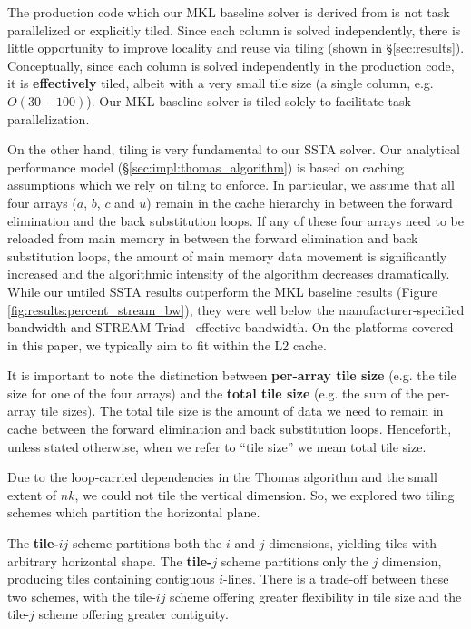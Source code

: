 \documentclass[10pt, conference, compsocconf]{IEEEtran}
\begin{document}
The production code which our MKL baseline solver is derived from is not task
  parallelized or explicitly tiled.
Since each column is solved independently, there is little opportunity to improve
  locality and reuse via tiling (shown in \S\ref{sec:results}).
Conceptually, since each column is solved independently in the production code,
  it is \textbf{effectively} tiled, albeit with a very small tile size (a single
  column, e.g. \(O(30-100)\)).
Our MKL baseline solver is tiled solely to facilitate task parallelization.

On the other hand, tiling is very fundamental to our SSTA solver.
Our analytical performance model (\S\ref{sec:impl:thomas_algorithm})
  is based on caching assumptions which we rely on tiling to enforce.
In particular, we assume that all four arrays (\(a\), \(b\), \(c\) and \(u\))
  remain in the cache hierarchy in between the forward elimination and the
  back substitution loops.
If any of these four arrays need to be reloaded from main memory in between the
  forward elimination and back substitution loops, the amount of main memory data
  movement is significantly increased and the algorithmic intensity of the
  algorithm decreases dramatically.
While our untiled SSTA results outperform the MKL baseline results (Figure
  \ref{fig:results:percent_stream_bw}), they were well below the manufacturer-specified
  bandwidth and STREAM Triad~\cite{stream} effective bandwidth.
On the platforms covered in this paper, we typically aim to fit within the L2
  cache.

It is important to note the distinction between \textbf{per-array tile size}
  (e.g. the tile size for one of the four arrays) and the
  \textbf{total tile size} (e.g. the sum of the per-array tile sizes).
The total tile size is the amount of data we need to remain in cache between
  the forward elimination and back substitution loops.
Henceforth, unless stated otherwise, when we refer to ``tile size'' we mean
  total tile size.

Due to the loop-carried dependencies in the Thomas algorithm and the small
  extent of \(nk\), we could not tile the vertical dimension. So, we explored two
  tiling schemes which partition the horizontal plane.

The \textbf{tile-\(ij\)} scheme partitions both the \(i\) and \(j\) dimensions,
  yielding tiles with arbitrary horizontal shape. 
The \textbf{tile-\(j\)} scheme partitions only the \(j\) dimension, producing
  tiles containing contiguous \(i\)-lines.
There is a trade-off between these two schemes, with the tile-\(ij\) scheme
  offering greater flexibility in tile size and the tile-\(j\) scheme offering
  greater contiguity. 
\end{document}
